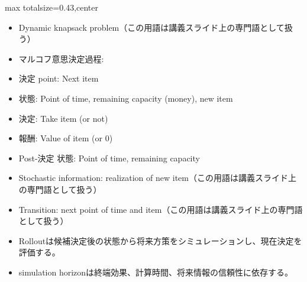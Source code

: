 \clearpage
{}
\begin{minipage}[t]{0.405\textwidth}
\begin{adjustbox}{max totalsize={\textwidth}{0.43\textheight},center}
\begin{minipage}{\textwidth}\scriptsize
{}\begin{itemize}
\item Dynamic knapsack problem（この用語は講義スライド上の専門語として扱う）
\item マルコフ意思決定過程:
\item 決定 point: Next item
\item 状態: Point of time, remaining capacity (money), new item
\item 決定: Take item (or not)
\item 報酬: Value of item (or 0)
\item Post-決定 状態: Point of time, remaining capacity
\item Stochastic information: realization of new item（この用語は講義スライド上の専門語として扱う）
\item Transition: next point of time and item（この用語は講義スライド上の専門語として扱う）
\end{itemize}\begin{itemize}
\item Rolloutは候補決定後の状態から将来方策をシミュレーションし、現在決定を評価する。
\item simulation horizonは終端効果、計算時間、将来情報の信頼性に依存する。
\end{itemize}
\end{minipage}
\end{adjustbox}
\end{minipage}\hfill
